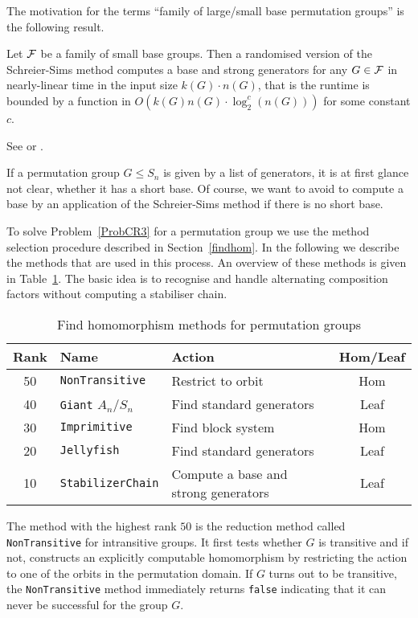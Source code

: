 The motivation for the terms ``family of large/small base permutation
groups'' is the following result.

\begin{Theo}
Let $\mathcal{F}$ be a family of small base groups. Then a randomised version
of the Schreier-Sims method computes a base and strong generators
for any $G \in \mathcal{F}$ in nearly-linear time in the input size $k(G)\cdot
n(G)$, that is the runtime is bounded by a function in
$O(k(G)n(G) \cdot \log^c_2(n(G)))$ for some constant $c$.
\end{Theo}
\proofbeg See \cite{nearlylin} or \cite[Theorem 4.5.5]{Ser}. \proofend

\medskip
If a permutation group $G \le S_n$ is given by a list of generators, it
is at first glance not clear, whether it has a short base. Of course,
we want to avoid to compute a base by an application of the Schreier-Sims
method if there is no short base.

To solve Problem~\ref{ProbCR3} for a permutation group we use the method
selection procedure described in Section~\ref{findhom}. In the following we
describe the methods that are used in this process. An overview of these 
methods is given in Table~\ref{permdb}. The basic idea is to recognise
and handle alternating composition factors without computing a stabiliser 
chain.

\begin{table}[ht]
\caption{Find homomorphism methods for permutation groups}
%
\label{permdb}
\begin{center}
\begin{tabular}{|c|l|l|c|}
\hline
Rank & Name & Action & Hom/Leaf \\
\hline
\hline
50 & \texttt{NonTransitive} & Restrict to orbit & Hom \\
\hline
40 & \texttt{Giant} $A_n/S_n$ & Find standard generators & Leaf \\
\hline
30 & \texttt{Imprimitive} & Find block system & Hom \\
\hline
20 & \texttt{Jellyfish} & Find standard generators & Leaf \\
\hline
10 & \texttt{StabilizerChain} & Compute a base and strong generators & Leaf \\
\hline
\end{tabular}
\end{center}
\end{table}

The method with the highest rank $50$ is the reduction method called
\texttt{NonTransitive} for intransitive groups. It first tests whether
$G$ is transitive and if not, constructs an explicitly
computable homomorphism by restricting the action to one of the orbits in the
permutation domain. If $G$ turns out to be transitive, the
\texttt{NonTransitive} method immediately returns \texttt{false}
indicating that it can never be successful for the group $G$.

